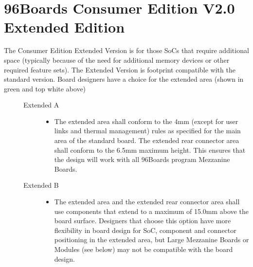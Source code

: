 \documentclass[a4paper,10pt,oneside,english]{sphinxmanual}
\begin{document}
\section{96Boards Consumer Edition V2.0 Extended Edition}
\label{\detokenize{chapter1-ce:boards-consumer-edition-v2-0-extended-edition}}
\sphinxAtStartPar
The Consumer Edition Extended Version is for those SoCs that require additional space (typically because of the need for additional memory devices or other required feature sets). The Extended Version is footprint compatible with the standard version.
Board designers have a choice for the extended area (shown in green and top white above)
\begin{description}
\item[{}] \leavevmode\begin{description}
\item[{Extended A}] \leavevmode\begin{itemize}
\item {} 
\sphinxAtStartPar
The extended area shall conform to the 4mm (except for user links and thermal management) rules as specified for the main area of the standard board. The extended rear connector area shall conform to the 6.5mm maximum height. This ensures that the design will work with all 96Boards program Mezzanine Boards.

\end{itemize}

\end{description}

\item[{}] \leavevmode\begin{description}
\item[{Extended B}] \leavevmode\begin{itemize}
\item {} 
\sphinxAtStartPar
The extended area and the extended rear connector area shall use components that extend to a maximum of 15.0mm above the board surface. Designers that choose this option have more flexibility in board design for SoC, component and connector positioning in the extended area, but Large Mezzanine Boards or Modules (see below) may not be compatible with the board design.

\end{itemize}

\end{description}

\end{description}
\end{document}
